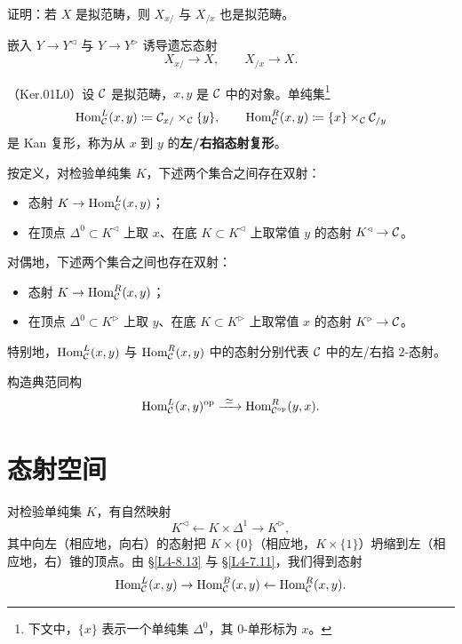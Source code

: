 \begin{exercise}\label{L4-8.10}
证明：若 $X$ 是拟范畴，则 $X_{x/}$ 与 $X_{/x}$ 也是拟范畴。
\end{exercise}

\nitem\label{L4-8.11} 嵌入 $Y\to Y^{\triangleleft}$ 与 $Y\to Y^{\triangleright}$ 诱导遗忘态射
\[
X_{x/}\to X,
\qquad
X_{/x}\to X.
\]

\begin{theoremdef}\label{L4-8.12}
（Ker.01L0）设 $\mathcal{C}$ 是拟范畴，$x,y$ 是 $\mathcal{C}$ 中的对象。单纯集\footnote{下文中，$\{x\}$ 表示一个单纯集 $\Delta^0$，其 $0$-单形标为 $x$。}
\[
\operatorname{Hom}^{L}_{\mathcal{C}}(x,y)\coloneqq\mathcal{C}_{x/}\times_{\mathcal{C}}\{y\},
\qquad
\operatorname{Hom}^{R}_{\mathcal{C}}(x,y)\coloneqq\{x\}\times_{\mathcal{C}}\mathcal{C}_{/y}
\]
是 Kan 复形，称为从 $x$ 到 $y$ 的\textbf{左/右掐态射复形}。
\end{theoremdef}

\nitem\label{L4-8.13} 按定义，对检验单纯集 $K$，下述两个集合之间存在双射：
\begin{itemize}[leftmargin=2.2em,itemsep=0.1em]
\item 态射 $K\to\operatorname{Hom}^{L}_{\mathcal{C}}(x,y)$；
\item 在顶点 $\Delta^0\subset K^{\triangleleft}$ 上取 $x$、在底 $K\subset K^{\triangleleft}$ 上取常值 $y$ 的态射 $K^{\triangleleft}\to\mathcal{C}$。
\end{itemize}
对偶地，下述两个集合之间也存在双射：
\begin{itemize}[leftmargin=2.2em,itemsep=0.1em]
\item 态射 $K\to\operatorname{Hom}^{R}_{\mathcal{C}}(x,y)$；
\item 在顶点 $\Delta^0\subset K^{\triangleright}$ 上取 $y$、在底 $K\subset K^{\triangleright}$ 上取常值 $x$ 的态射 $K^{\triangleright}\to\mathcal{C}$。
\end{itemize}
特别地，$\operatorname{Hom}^{L}_{\mathcal{C}}(x,y)$ 与 $\operatorname{Hom}^{R}_{\mathcal{C}}(x,y)$ 中的态射分别代表 $\mathcal{C}$ 中的左/右掐 $2$-态射。

\begin{exercise}\label{L4-8.14}
构造典范同构
\[
\Hom^{L}_{\cC}(x,y)^{\op}\xrightarrow{\ \simeq\ }\Hom^{R}_{\cC^{\op}}(y,x).
\]
\end{exercise}

\section{态射空间}

\nitem\label{L4-9.1} 对检验单纯集 $K$，有自然映射
\[
K^{\triangleleft}\leftarrow K\times\Delta^1\to K^{\triangleright},
\]
其中向左（相应地，向右）的态射把 $K\times\{0\}$（相应地，$K\times\{1\}$）坍缩到左（相应地，右）锥的顶点。由 \S\ref{L4-8.13} 与 \S\ref{L4-7.11}，我们得到态射
\begin{equation}\label{L4-9.1eq}
\operatorname{Hom}^{L}_{\mathcal{C}}(x,y)\to\operatorname{Hom}^{B}_{\mathcal{C}}(x,y)\leftarrow\operatorname{Hom}^{R}_{\mathcal{C}}(x,y).
\end{equation}

